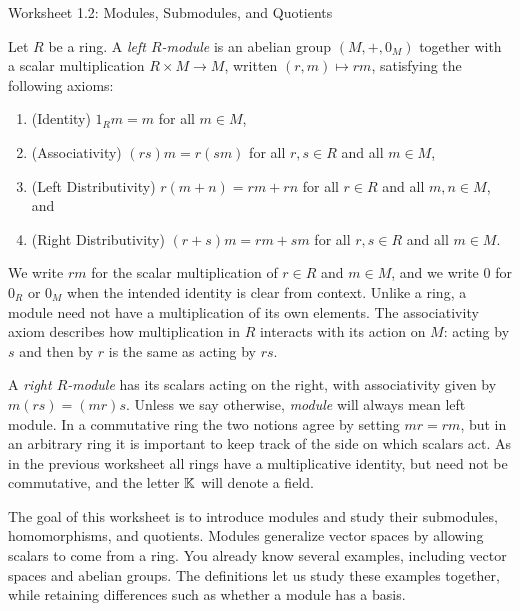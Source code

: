 \documentclass[Notebook.tex]{subfiles}
\begin{document}
\ifSubfilesClassLoaded{
    
}{}

\begin{center}
	{Worksheet 1.2: Modules, Submodules, and Quotients}
\end{center}

Let $R$ be a ring. A \emph{left $R$-module} is an abelian group $(M,+,0_M)$ together with a scalar multiplication $R\times M\to M$, written $(r,m)\mapsto rm$, satisfying the following axioms:
\begin{enumerate}[label=(\roman*)]
	\item (Identity) $1_Rm=m$ for all $m\in M$,
	\item (Associativity) $(rs)m=r(sm)$ for all $r,s\in R$ and all $m\in M$,
	\item (Left Distributivity) $r(m+n)=rm+rn$ for all $r\in R$ and all $m,n\in M$, and
	\item (Right Distributivity) $(r+s)m=rm+sm$ for all $r,s\in R$ and all $m\in M$.
\end{enumerate}
We write $rm$ for the scalar multiplication of $r\in R$ and $m\in M$, and we write $0$ for $0_R$ or $0_M$ when the intended identity is clear from context. Unlike a ring, a module need not have a multiplication of its own elements. The associativity axiom describes how multiplication in $R$ interacts with its action on $M$: acting by $s$ and then by $r$ is the same as acting by $rs$.

A \emph{right $R$-module} has its scalars acting on the right, with associativity given by $m(rs)=(mr)s$. Unless we say otherwise, \emph{module} will always mean left module. In a commutative ring the two notions agree by setting $mr=rm$, but in an arbitrary ring it is important to keep track of the side on which scalars act. As in the previous worksheet all rings have a multiplicative identity, but need not be commutative, and the letter $\mathbb K$ will denote a field.

The goal of this worksheet is to introduce modules and study their submodules, homomorphisms, and quotients. Modules generalize vector spaces by allowing scalars to come from a ring. You already know several examples, including vector spaces and abelian groups. The definitions let us study these examples together, while retaining differences such as whether a module has a basis.

\hrulefill
\end{document}
